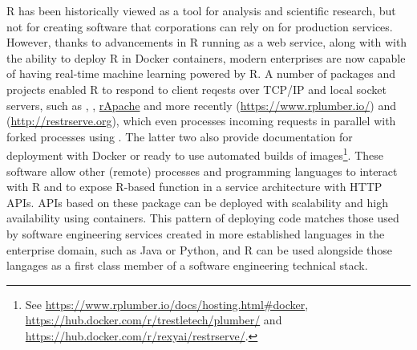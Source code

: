 R has been historically viewed as a tool for analysis and scientific
research, but not for creating software that corporations can rely on
for production services. However, thanks to advancements in R running as
a web service, along with with the ability to deploy R in Docker
containers, modern enterprises are now capable of having real-time
machine learning powered by R. A number of packages and projects enabled
R to respond to client reqests over TCP/IP and local socket servers,
such as , ,
\href{http://www.rapache.net}{rApache} and more recently
 (\url{https://www.rplumber.io/}) and 
(\url{http://restrserve.org}), which even processes incoming requests in
parallel with forked processes using . The latter two
also provide documentation for deployment with Docker or ready to use
automated builds of
images\footnote{See \href{https://www.rplumber.io/docs/hosting.html\#docker}{https://www.rplumber.io/docs/hosting.html\#docker}, \href{https://hub.docker.com/r/trestletech/plumber/}{https://hub.docker.com/r/trestletech/plumber/} and \href{https://hub.docker.com/r/rexyai/restrserve/}{https://hub.docker.com/r/rexyai/restrserve/}.}.
These software allow other (remote) processes and programming languages
to interact with R and to expose R-based function in a service
architecture with HTTP APIs. APIs based on these package can be deployed
with scalability and high availability using containers. This pattern of
deploying code matches those used by software engineering services
created in more established languages in the enterprise domain, such as
Java or Python, and R can be used alongside those langages as a first
class member of a software engineering technical stack.

